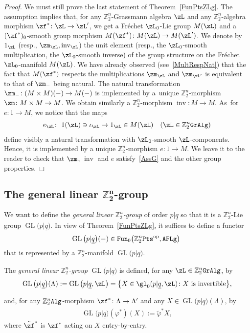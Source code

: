 \documentclass[10pt,a4paper]{amsart}
\newcommand{\op}[1]{\operatorname{#1}}
\DeclareMathOperator{\GL}{GL}
\newcommand{\Z}{{\mathbb Z}}
\def\ul{\underline}
\def\ul{\underline}
\newcommand{\0}{\otimes}
\newcommand{\z}{\Z_2^n}
\numberwithin{equation}{section}
\begin{document}
\begin{proof}
We must still prove the last statement of Theorem~\ref{FunPtsZLg}. The assumption implies that, for any $\z$-Grassmann algebra $\zL$ and any $\z$-algebra morphism $\zf^*\colon \zL\to\zL'$, we get a Fr\'echet $\zL_0$-Lie group $M(\zL)$ and a $(\zf^*)_0$-smooth group morphism $M(\zf^*)\colon M(\zL)\to M(\zL')$. We denote by $1_\zL$ (resp., $\zm_\zL,\op{inv}_\zL$) the unit element (resp., the $\zL_0$-smooth multiplication, the $\zL_0$-smooth inverse) of the group structure on the Fr\'echet $\zL_0$-manifold $M(\zL)$. We have already observed (see~\eqref{MultRespNat}) that the fact that $M(\zf^*)$ respects the multiplications $\zm_\zL$ and $\zm_{\zL'}$ is equivalent to that of $\zm_-$ being natural. The natural transformation $\zm_-\colon (M\times M)(-)\to M(-)$ is implemented by a~unique $\z$-morphism $\zm\colon M\times M\to M$. We obtain similarly a $\z$-morphism $\op{inv}\colon M\to M$. As~for $e\colon 1\to M$, we notice that the maps
\[
e_\zL\colon \ 1(\zL)\ni\iota_\zL\mapsto 1_\zL\in M(\zL)\quad (\zL\in\z{\tt GrAlg})
\]
 define visibly a natural transformation with $\zL_0$-smooth $\zL$-components. Hence, it is implemented by a unique $\z$-morphism $e\colon 1\to M$. We leave it to the reader to check that $\zm$, $\op{inv}$ and $e$ satisfy~\eqref{AssG} and the other group properties. \end{proof}

\subsection[The general linear Z2n-group]{The general linear $\boldsymbol{\Z_2^n}$-group}
We want to define the {\it general linear $\z$-group} of order $p|\ul q$ so that it is a $\z$-Lie group $\op{GL}\big(p|\ul q\big)$. In view of Theorem~\ref{FunPtsZLg}, it suffices to define a functor
\[
\op{GL}\big(p|\ul q\big)(-)\in{\tt Fun}_0\big(\z{\tt Pts}^{\op{op}},{\tt AFLg}\big)\;
\]
 that is represented by a $\z$-manifold $\op{GL}\big(p|\ul q\big)$.

\begin{Definition}\label{def:GLp|q}
The \emph{general linear $\Z_2^n$-group} $\op{GL}\big(p|\ul q\big)$ is defined, for any $\zL\in\z{\tt GrAlg}$, by
%
\[
\GL\big(p|\ul{q}\big)(\Lambda) := \op{GL}\big(p|\ul q,\zL\big)=\big\{ X \in \gl_0(p|\ul{q},\zL)\colon X \textnormal{ is invertible} \big \},
\]

%
and, for any $\z{\tt Alg}$-morphism $\zf^* \colon \Lambda \rightarrow \Lambda'$ and any $X\in\GL\big(p|\ul{q}\big)(\Lambda)$, by
%
\begin{align*}
\GL\big(p|\ul{q}\big)(\varphi^*)(X):=\tilde\varphi^*X,
\end{align*}
%
where $\tilde\zf^*$ is $\zf^*$ acting on $X$ entry-by-entry.\end{Definition}
\end{document}
